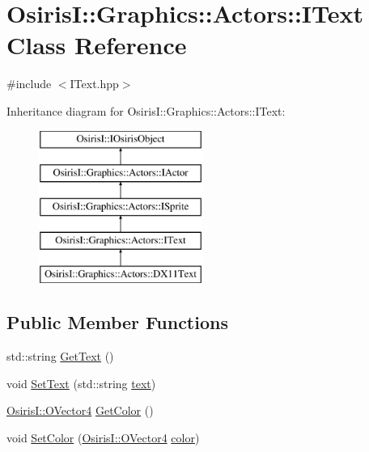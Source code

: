 \hypertarget{class_osiris_i_1_1_graphics_1_1_actors_1_1_i_text}{\section{Osiris\-I\-:\-:Graphics\-:\-:Actors\-:\-:I\-Text Class Reference}
\label{class_osiris_i_1_1_graphics_1_1_actors_1_1_i_text}
}


{\ttfamily \#include $<$I\-Text.\-hpp$>$}

Inheritance diagram for Osiris\-I\-:\-:Graphics\-:\-:Actors\-:\-:I\-Text\-:\begin{figure}[H]
\begin{center}
\leavevmode
\includegraphics[height=5.000000cm]{class_osiris_i_1_1_graphics_1_1_actors_1_1_i_text}
\end{center}
\end{figure}
\subsection*{Public Member Functions}
\begin{DoxyCompactItemize}
\item 
std\-::string \hyperlink{class_osiris_i_1_1_graphics_1_1_actors_1_1_i_text_a69fd105269380c6572d73f722613086b}{Get\-Text} ()
\item 
void \hyperlink{class_osiris_i_1_1_graphics_1_1_actors_1_1_i_text_a055b2d31c8a631e13a5e926746ec9dc5}{Set\-Text} (std\-::string \hyperlink{class_osiris_i_1_1_graphics_1_1_actors_1_1_i_text_ac61379d2b25119354434d62ba327d882}{text})
\item 
\hyperlink{struct_osiris_i_1_1_o_vector4}{Osiris\-I\-::\-O\-Vector4} \hyperlink{class_osiris_i_1_1_graphics_1_1_actors_1_1_i_text_a93bd4fe0a45ebd8e91d1754dd1c09c5c}{Get\-Color} ()
\item 
void \hyperlink{class_osiris_i_1_1_graphics_1_1_actors_1_1_i_text_a2ad2b07537a9e0c13c53bd631d76c356}{Set\-Color} (\hyperlink{struct_osiris_i_1_1_o_vector4}{Osiris\-I\-::\-O\-Vector4} \hyperlink{class_osiris_i_1_1_graphics_1_1_actors_1_1_i_text_a2d353e301a379540fd86d549911e8001}{color})
\end{DoxyCompactItemize}
